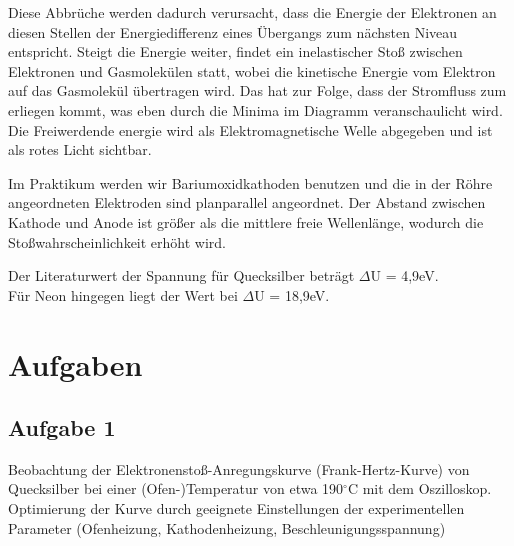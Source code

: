 \documentclass{article}
\begin{document}
{Diese Abbrüche werden dadurch verursacht, dass die Energie der Elektronen an diesen Stellen der Energiedifferenz eines Übergangs zum nächsten Niveau entspricht. Steigt die Energie weiter, findet ein inelastischer Stoß zwischen Elektronen und Gasmolekülen statt, wobei die kinetische Energie vom Elektron auf das Gasmolekül übertragen wird. Das hat zur Folge, dass der Stromfluss zum erliegen kommt, was eben durch die Minima im Diagramm veranschaulicht wird. Die Freiwerdende energie wird als Elektromagnetische Welle abgegeben und ist als rotes Licht sichtbar.


Im Praktikum werden wir Bariumoxidkathoden benutzen und die in der Röhre angeordneten Elektroden sind planparallel angeordnet. Der Abstand zwischen Kathode und Anode ist größer als die mittlere freie Wellenlänge, wodurch die Stoßwahrscheinlichkeit erhöht wird.

{\begin{center}
\begin{minipage}{\linewidth}
\centering
{}
%
\label{verlauf}
\end{minipage}
\end{center}


Der Literaturwert der Spannung für Quecksilber beträgt \(\Delta\)U = 4,9eV.\\
Für Neon hingegen liegt der Wert bei \(\Delta\)U = 18,9eV.

\newpage
\section{Aufgaben}
\subsection*{Aufgabe 1}
Beobachtung der Elektronenstoß-Anregungskurve (Frank-Hertz-Kurve) von Quecksilber bei einer (Ofen-)Temperatur von etwa 190\(^\circ\)C mit dem Oszilloskop. Optimierung der Kurve durch geeignete Einstellungen der experimentellen Parameter (Ofenheizung, Kathodenheizung, Beschleunigungsspannung)

}}
\end{document}
